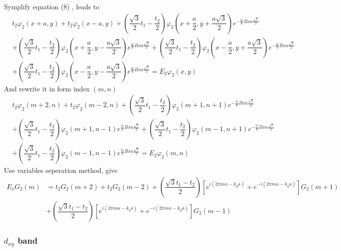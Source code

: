 \documentclass{report}
\newcommand{\f}[2]{\dfrac{#1}{#2}}
\begin{document}
Symplify equation (8) , leads to
\begin{align*}
	 & t_{2} \varphi_{2}(x+a,y) + t_{2} \varphi_{2}(x-a,y)
	+ \left( \f{\sqrt{3}}{2}t_{1} - \f{t_{2}}{2}\right)\varphi_{2}(x + \f{a}{2},y + \f{a\sqrt{3}}{2}) e^{-\frac{ie}{\hbar} Bxa\frac{\sqrt{3}}{2}}                            \\
	 & + \left( \f{\sqrt{3}}{2}t_{1} - \f{t_{2}}{2}\right)\varphi_{2}(x + \f{a}{2},y - \f{a\sqrt{3}}{2}) e^{\frac{ie}{\hbar} Bxa\frac{\sqrt{3}}{2}}
	+ \left( \f{\sqrt{3}}{2}t_{1} - \f{t_{2}}{2}\right)\varphi_{2}(x - \f{a}{2},y + \f{a\sqrt{3}}{2}) e^{-\frac{ie}{\hbar} Bxa\frac{\sqrt{3}}{2}}                            \\
	 & + \left( \f{\sqrt{3}}{2}t_{1} - \f{t_{2}}{2}\right)\varphi_{2}(x - \f{a}{2},y - \f{a\sqrt{3}}{2}) e^{\frac{ie}{\hbar} Bxa\frac{\sqrt{3}}{2}} = E_{2} \varphi_{2}(x,y)
\end{align*}
And rewrite it in form index $(m,n)$
\begin{align*}
	 & t_{2} \varphi_{2}(m+2,n) + t_{2} \varphi_{2}(m-2,n)
	+ \left( \f{\sqrt{3}}{2}t_{1} - \f{t_{2}}{2}\right)\varphi_{2}(m+1,n+1) e^{-\frac{ie}{\hbar} Bxa\frac{\sqrt{3}}{2}}                            \\
	 & + \left( \f{\sqrt{3}}{2}t_{1} - \f{t_{2}}{2}\right)\varphi_{2}(m+1,n-1) e^{\frac{ie}{\hbar} Bxa\frac{\sqrt{3}}{2}}
	+ \left( \f{\sqrt{3}}{2}t_{1} - \f{t_{2}}{2}\right)\varphi_{2}(m-1,n+1) e^{-\frac{ie}{\hbar} Bxa\frac{\sqrt{3}}{2}}                            \\
	 & + \left( \f{\sqrt{3}}{2}t_{1} - \f{t_{2}}{2}\right)\varphi_{2}(m-1,n-1) e^{\frac{ie}{\hbar} Bxa\frac{\sqrt{3}}{2}} = E_{2} \varphi_{2}(m,n)
\end{align*}
Use variables seperation method, give
\begin{align*}
	E_{1}G_{2}(m)
	 & = t_{2}G_{2}(m+2) + t_{2}G_{2}(m-2) + \left( \f{\sqrt{3}t_{1} - t_{2}}{2} \right)\left[e^{i(2\pi m \alpha - k_y a)} + e^{-i(2\pi m \alpha - k_y a)}\right] G_{2}(m+1) \\
	 & + \left( \f{\sqrt{3}t_{1} - t_{2}}{2} \right)\left[e^{i(2\pi m \alpha - k_y a)} + e^{-i(2\pi m \alpha - k_y a)}\right] G_{2}(m-1) \tag{9}
\end{align*}



\subsubsection*{$d_{xy}$ band}
\end{document}
